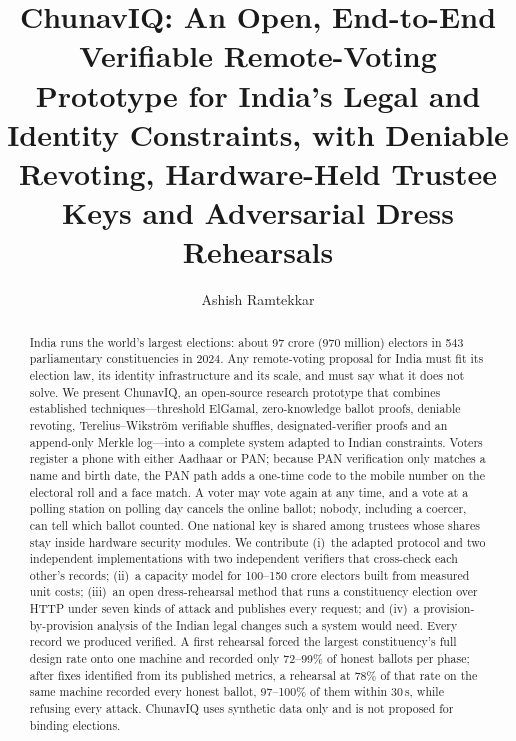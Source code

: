 \documentclass[runningheads]{llncs}
\begin{document}
\title{ChunavIQ: An Open, End-to-End Verifiable Remote-Voting Prototype for India's Legal and Identity Constraints, with Deniable Revoting, Hardware-Held Trustee Keys and Adversarial Dress Rehearsals}

\author{Ashish Ramtekkar}

\maketitle

\begin{abstract}
India runs the world's largest elections: about 97 crore (970 million) electors in 543 parliamentary constituencies in 2024. Any remote-voting proposal for India must fit its election law, its identity infrastructure and its scale, and must say what it does not solve. We present ChunavIQ, an open-source research prototype that combines established techniques---threshold ElGamal, zero-knowledge ballot proofs, deniable revoting, Terelius--Wikstr{\"o}m verifiable shuffles, designated-verifier proofs and an append-only Merkle log---into a complete system adapted to Indian constraints. Voters register a phone with either Aadhaar or PAN; because PAN verification only matches a name and birth date, the PAN path adds a one-time code to the mobile number on the electoral roll and a face match. A voter may vote again at any time, and a vote at a polling station on polling day cancels the online ballot; nobody, including a coercer, can tell which ballot counted. One national key is shared among trustees whose shares stay inside hardware security modules. We contribute (i)~the adapted protocol and two independent implementations with two independent verifiers that cross-check each other's records; (ii)~a capacity model for 100--150 crore electors built from measured unit costs; (iii)~an open dress-rehearsal method that runs a constituency election over HTTP under seven kinds of attack and publishes every request; and (iv)~a provision-by-provision analysis of the Indian legal changes such a system would need. Every record we produced verified. A first rehearsal forced the largest constituency's full design rate onto one machine and recorded only 72--99\% of honest ballots per phase; after fixes identified from its published metrics, a rehearsal at 78\% of that rate on the same machine recorded every honest ballot, 97--100\% of them within 30\,s, while refusing every attack. ChunavIQ uses synthetic data only and is not proposed for binding elections.

\end{abstract}
\end{document}
